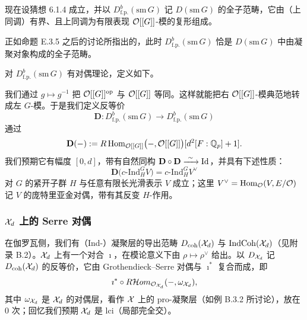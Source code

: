 现在设猜想 6.1.4 成立，并以 $D^b_{\mathrm{f.p.}}(\mathrm{sm}\,G)$ 记 $D(\mathrm{sm}\,G)$ 的全子范畴，它由（上同调）有界、且上同调为有限表现 $\mathcal{O}[[G]]$-模的复形组成。

正如命题 E.3.5 之后的讨论所指出的，此时 $D^b_{\mathrm{f.p.}}(\mathrm{sm}\,G)$ 恰是 $D(\mathrm{sm}\,G)$ 中由凝聚对象构成的全子范畴。

对 $D^b_{\mathrm{f.p.}}(\mathrm{sm}\,G)$ 有对偶理论，定义如下。

我们通过 $g\mapsto g^{-1}$ 把 $\mathcal{O}[[G]]^{\mathrm{op}}$ 与 $\mathcal{O}[[G]]$ 等同。这样就能把右 $\mathcal{O}[[G]]$-模典范地转成左 $G$-模。于是我们定义反等价
\[
\mathbf{D}:D^b_{\mathrm{f.p.}}(\mathrm{sm}\,G)\longrightarrow D^b_{\mathrm{f.p.}}(\mathrm{sm}\,G)
\]
通过
\[
\mathbf{D}(-):=R\operatorname{Hom}_{\mathcal{O}[[G]]}\bigl(-,\mathcal{O}[[G]]\bigr)[d^2[F:\mathbb{Q}_p]+1].
\]
我们预期它有幅度 $[0,d]$，带有自然同构 $\mathbf{D}\circ\mathbf{D}\xrightarrow{\ \sim\ }\mathrm{Id}$，并具有下述性质：
\begin{equation}\tag{6.1.7}\label{eq:a4-6-1-7}
\mathbf{D}\bigl(c\text{-}\mathrm{Ind}_H^G V\bigr)=c\text{-}\mathrm{Ind}_H^G V^\vee
\end{equation}
对 $G$ 的紧开子群 $H$ 与任意有限长光滑表示 $V$ 成立；这里 $V^\vee=\operatorname{Hom}_{\mathcal{O}}(V,E/\mathcal{O})$ 记 $V$ 的庞特里亚金对偶，带有其反变 $H$-作用。

\subsubsection{$\mathcal{X}_d$ 上的 Serre 对偶}
在伽罗瓦侧，我们有（Ind-）凝聚层的导出范畴 $D_{\mathrm{coh}}(\mathcal{X}_d)$ 与 $\operatorname{IndCoh}(\mathcal{X}_d)$（见附录 B.2）。$\mathcal{X}_d$ 上有一个对合 $\imath$，在模论意义下由 $\rho\mapsto\rho^\vee$ 给出。以 $D_{\mathcal{X}_d}$ 记 $D_{\mathrm{coh}}(\mathcal{X}_d)$ 的反等价，它由 Grothendieck--Serre 对偶与 $\imath^*$ 复合而成，即
\[
\imath^*\circ R\mathcal{H}om_{\mathcal{O}_{\mathcal{X}_d}}(-,\omega_{\mathcal{X}_d}),
\]
其中 $\omega_{\mathcal{X}_d}$ 是 $\mathcal{X}_d$ 的对偶层，看作 $\mathcal{X}$ 上的 pro-凝聚层（如例 B.3.2 所讨论），放在 $0$ 次；回忆我们预期 $\mathcal{X}_d$ 是 lci（局部完全交）。

